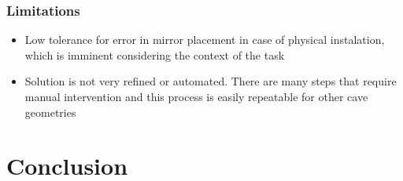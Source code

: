 \documentclass[11pt, letterpaper]{article}
\begin{document}
\subsubsection{Limitations}
\begin{itemize}


\item Low tolerance for error in mirror placement in case of physical instalation, which is imminent considering the context of the task

\item Solution is not very refined or automated. There are many steps that require manual intervention and this process is easily repeatable for other cave geometries

\end{itemize}
\section{Conclusion}


 
\end{document}
